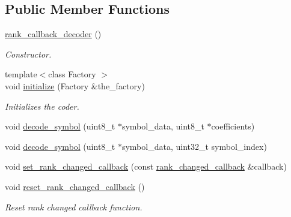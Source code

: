 \subsection*{Public Member Functions}
\begin{DoxyCompactItemize}
\item 
\hypertarget{classkodo_1_1rank__callback__decoder_ae217b6d103d1f8856e7e45d5df966935}{\hyperlink{classkodo_1_1rank__callback__decoder_ae217b6d103d1f8856e7e45d5df966935}{rank\-\_\-callback\-\_\-decoder} ()}\label{classkodo_1_1rank__callback__decoder_ae217b6d103d1f8856e7e45d5df966935}

\begin{DoxyCompactList}\small\item\em Constructor. \end{DoxyCompactList}\item 
{\footnotesize template$<$class Factory $>$ }\\void \hyperlink{classkodo_1_1rank__callback__decoder_a4a65c05528939d8d15a5abfb55d70b52}{initialize} (Factory \&the\-\_\-factory)
\begin{DoxyCompactList}\small\item\em Initializes the coder. \end{DoxyCompactList}\item 
void \hyperlink{classkodo_1_1rank__callback__decoder_a1ec61392b090985a1f8d9aff2a57c542}{decode\-\_\-symbol} (uint8\-\_\-t $\ast$symbol\-\_\-data, uint8\-\_\-t $\ast$coefficients)
\begin{DoxyCompactList}\small\item\em \end{DoxyCompactList}\item 
void \hyperlink{classkodo_1_1rank__callback__decoder_a133a52aa81876546549cf15c60d04c2d}{decode\-\_\-symbol} (uint8\-\_\-t $\ast$symbol\-\_\-data, uint32\-\_\-t symbol\-\_\-index)
\begin{DoxyCompactList}\small\item\em \end{DoxyCompactList}\item 
void \hyperlink{classkodo_1_1rank__callback__decoder_a1bdfbd89baaa93fc50cca6c0941671e9}{set\-\_\-rank\-\_\-changed\-\_\-callback} (const \hyperlink{classkodo_1_1rank__callback__decoder_a44bad0740473037f1e3f6a32dec28db9}{rank\-\_\-changed\-\_\-callback} \&callback)
\item 
\hypertarget{classkodo_1_1rank__callback__decoder_aee90041d06fe4074bb7a578461d602e9}{void \hyperlink{classkodo_1_1rank__callback__decoder_aee90041d06fe4074bb7a578461d602e9}{reset\-\_\-rank\-\_\-changed\-\_\-callback} ()}\label{classkodo_1_1rank__callback__decoder_aee90041d06fe4074bb7a578461d602e9}

\begin{DoxyCompactList}\small\item\em Reset rank changed callback function. \end{DoxyCompactList}\end{DoxyCompactItemize}


